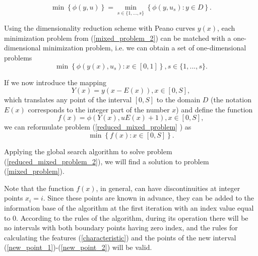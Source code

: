 \documentclass[runningheads]{llncs}
\begin{document}
\begin{equation}\label{mixed_problem_2} 
 \min \left\{\phi(y, u)\right\} = \min_{s \in \{1, ..., s\}} \left\{\phi(y, u_s): y \in D\right\}.
\end{equation}

Using the dimensionality reduction scheme with Peano curves $y(x)$, each minimization problem from (\ref{mixed_problem_2}) can be matched with a one-dimensional minimization problem, i.e. we can obtain a set of one-dimensional problems
\begin{equation}\label{reduced_mixed_problem} 
 \min \left\{\phi(y(x), u_s): x \in [0,1]\right\}, s \in \{1, ..., s\}.
\end{equation}

If we now introduce the mapping
\[
Y(x) = y(x-E(x)), x \in [0, S],
\]
which translates any point of the interval $[0,S]$ to the domain $D$ (the notation $E(x)$ corresponds to the integer part of the number $x$) and define the function
\[
f(x)=\phi(Y(x), uE(x) + 1), x \in [0, S],
\]
we can reformulate problem (\ref{reduced_mixed_problem} ) as
\begin{equation}\label{reduced_mixed_problem_2} 
 \min \left\{f(x): x \in [0,S]\right\}.
\end{equation}

Applying the global search algorithm to solve problem (\ref{reduced_mixed_problem_2}), we will find a solution to problem (\ref{mixed_problem}). 

Note that the function $f(x)$, in general, can have discontinuities at integer points $x_i=i$. Since these points are known in advance, they can be added to the information base of the algorithm at the first iteration with an index value equal to $0$. According to the rules of the algorithm, during its operation there will be no intervals with both boundary points having zero index, and the rules for calculating the features (\ref{characteristic}) and the points of the new interval (\ref{new_point_1})-(\ref{new_point_2}) will be valid.
\end{document}
